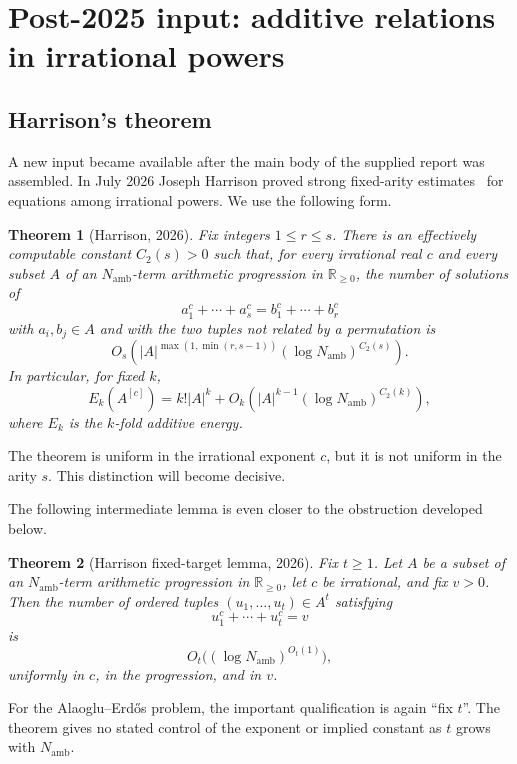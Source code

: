 \documentclass[11pt,oneside]{article}
\newtheorem{theorem}{Theorem}[section]
\theoremstyle{definition}
\newcommand{\R}{\mathbb{R}}
\begin{document}
\section{Post-2025 input: additive relations in irrational powers}

\subsection{Harrison's theorem}

A new input became available after the main body of the supplied report was assembled.  In July 2026 Joseph Harrison proved strong fixed-arity estimates~\cite{Harrison2026} for equations among irrational powers.  We use the following form.

\begin{theorem}[Harrison, 2026]\label{thm:harrison}
Fix integers $1\le r\le s$.  There is an effectively computable constant $C_2(s)>0$ such that, for every irrational real $c$ and every subset $A$ of an $N_{\mathrm{amb}}$-term arithmetic progression in $\R_{\ge0}$, the number of solutions of
\[
      a_1^c+\cdots+a_s^c=b_1^c+\cdots+b_r^c
\]
with $a_i,b_j\in A$ and with the two tuples not related by a permutation is
\[
      O_s\!\left(|A|^{\max(1,\min(r,s-1))}
                 (\log N_{\mathrm{amb}})^{C_2(s)}\right).
\]
In particular, for fixed $k$,
\[
 E_k(A^{[c]})
 =k!|A|^k+O_k\!\left(|A|^{k-1}
                  (\log N_{\mathrm{amb}})^{C_2(k)}\right),
\]
where $E_k$ is the $k$-fold additive energy.
\end{theorem}

The theorem is uniform in the irrational exponent $c$, but it is not uniform in the arity $s$.  This distinction will become decisive.

The following intermediate lemma is even closer to the obstruction developed below.

\begin{theorem}[Harrison fixed-target lemma, 2026]\label{thm:harrisonfixedtarget}
Fix $t\geq1$.  Let $A$ be a subset of an $N_{\mathrm{amb}}$-term arithmetic progression in $\R_{\geq0}$, let $c$ be irrational, and fix $v>0$.  Then the number of ordered tuples $(u_1,\ldots,u_t)\in A^t$ satisfying
\[
        u_1^c+\cdots+u_t^c=v
\]
is
\[
        O_t\bigl((\log N_{\mathrm{amb}})^{O_t(1)}\bigr),
\]
uniformly in $c$, in the progression, and in $v$.
\end{theorem}

For the Alaoglu--Erd\H{o}s problem, the important qualification is again ``fix $t$''.  The theorem gives no stated control of the exponent or implied constant as $t$ grows with $N_{\mathrm{amb}}$.
\end{document}
